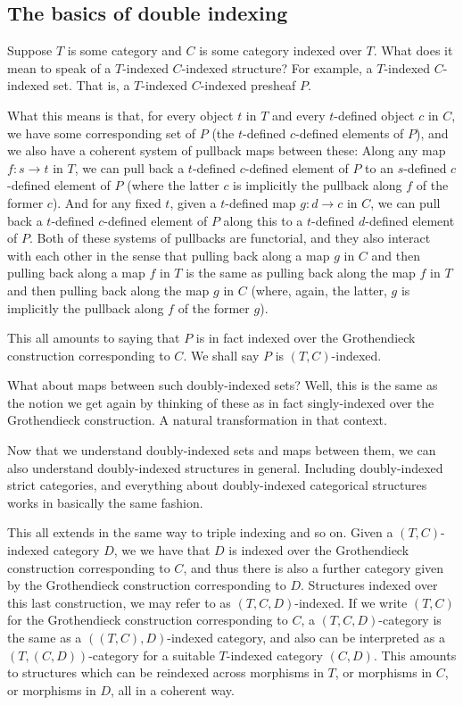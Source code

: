 \subsection{The basics of double indexing}
Suppose $T$ is some category and $C$ is some category indexed over $T$. What does it mean to speak of a $T$-indexed $C$-indexed structure? For example, a $T$-indexed $C$-indexed set. That is, a $T$-indexed $C$-indexed presheaf $P$.

What this means is that, for every object $t$ in $T$ and every $t$-defined object $c$ in $C$, we have some corresponding set of $P$ (the $t$-defined $c$-defined elements of $P$), and we also have a coherent system of pullback maps between these: Along any map $f : s \to t$ in $T$, we can pull back a $t$-defined $c$-defined element of $P$ to an $s$-defined $c$-defined element of $P$ (where the latter $c$ is implicitly the pullback along $f$ of the former $c$). And for any fixed $t$, given a $t$-defined map $g : d \to c$ in $C$, we can pull back a $t$-defined $c$-defined element of $P$ along this to a $t$-defined $d$-defined element of $P$. Both of these systems of pullbacks are functorial, and they also interact with each other  in the sense that pulling back along a map $g$ in $C$ and then pulling back along a map $f$ in $T$ is the same as pulling back along the map $f$ in $T$ and then pulling back along the map $g$ in $C$ (where, again, the latter, $g$ is implicitly the pullback along $f$ of the former $g$).

This all amounts to saying that $P$ is in fact indexed over the Grothendieck construction corresponding to $C$. We shall say $P$ is $(T, C)$-indexed.

What about maps between such doubly-indexed sets? Well, this is the same as the notion we get again by thinking of these as in fact singly-indexed over the Grothendieck construction. A natural transformation in that context.

Now that we understand doubly-indexed sets and maps between them, we can also understand doubly-indexed structures in general. Including doubly-indexed strict categories, and everything about doubly-indexed categorical structures works in basically the same fashion.

This all extends in the same way to triple indexing and so on. Given a $(T, C)$-indexed category $D$, we we have that $D$ is indexed over the Grothendieck construction corresponding to $C$, and thus there is also a further category given by the Grothendieck construction corresponding to $D$. Structures indexed over this last construction, we may refer to as $(T, C, D)$-indexed. If we write $(T, C)$ for the Grothendieck construction corresponding to $C$, a $(T, C, D)$-category is the same as a $((T, C), D)$-indexed category, and also can be interpreted as a $(T, (C, D))$-category for a suitable $T$-indexed category $(C, D)$. This amounts to structures which can be reindexed across morphisms in $T$, or  morphisms in $C$, or morphisms in $D$, all in a coherent way.

